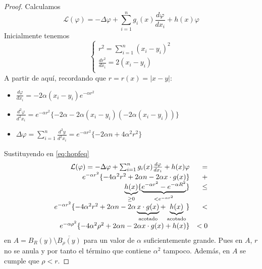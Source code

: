\begin{proof}
\noindent Calculamos
\begin{equation}\label{eq:hopfeq}
\mathcal{L}(\varphi) = -\Delta \varphi + \sum_{i=1}^n g_i(x)\frac{d\varphi}{dx_i} + h(x)\varphi
\end{equation}
Inicialmente tenemos
\begin{equation*}
\left\{
\begin{array}{l}
r^2 = \sum_{i=1}^n(x_i-y_i)^2\\
\frac{dr^2}{dx_i}=2(x_i-y_i)\\
\end{array}
\right.
\end{equation*}
A partir de aquí, recordando que $r = r(x) = |x-y|$:
\begin{itemize}
\item $\frac{d\varphi}{dx_i} = -2\alpha(x_i-y_i)e^{-\alpha r^2}$
\item $\frac{d^2\varphi}{d^2x_i} = e^{-\alpha r^2}\{-2\alpha-2\alpha(x_i-y_i)(-2\alpha(x_i-y_i)) \}$
\item $\Delta\varphi = \sum_{i=1}^n \frac{d^2y}{d^2x_i}= e^{-\alpha r^2}\{-2\alpha n+4\alpha^2r^2\}$
\end{itemize}
Sustituyendo en \eqref{eq:hopfeq}
\begin{equation*}
\begin{array}{r r}
\mathcal{L}(\varphi) = -\Delta \varphi + \sum_{i=1}^n g_i(x)\frac{d\varphi}{dx_i} + h(x)\varphi & = \\
e^{-\alpha r^2}\{-4\alpha^2r^2+2\alpha n-2\alpha x \cdot g(x)\} & + \\
\underbrace{h(x)}_{\ge 0}\{\underbrace{e^{-\alpha r^2}-e^{-\alpha R^2}}_{<e^{-\alpha r^2}}\} & \le \\
e^{-\alpha r^2}\{-4\alpha^2r^2+2\alpha n-2\alpha \underbrace{x \cdot g(x)}_{\text{acotado}} + \underbrace{h(x)}_{\text{acotado}}\} & < \\
e^{-\alpha \rho^2}\{-4\alpha^2\rho^2+2\alpha n-2\alpha x \cdot g(x) + h(x)\} & < 0 \\
\end{array}
\end{equation*}
en $A = B_R(y)\setminus \overline{B_\rho(y)}$ para un valor de $\alpha$ suficientemente grande. Pues en $A$, $r$ no se anula y por tanto el término que contiene $\alpha^2$ tampoco. Además, en $A$ se cumple que $\rho < r$.


\end{proof}
